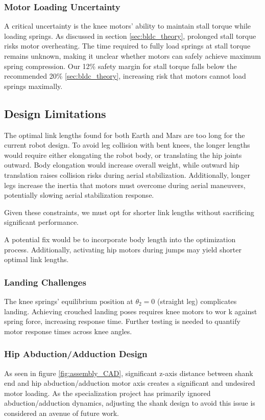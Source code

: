 \subsubsection{Motor Loading Uncertainty}
A critical uncertainty is the knee motors' ability to maintain stall torque while loading springs. As discussed in section \ref{sec:bldc_theory}, prolonged stall torque risks motor overheating. The time required to fully load springs at stall torque remains unknown, making it unclear whether motors can safely achieve maximum spring compression. Our 12\% safety margin for stall torque falls below the recommended 20\% \ref{sec:bldc_theory}, increasing risk that motors cannot load springs maximally.

\subsection{Design Limitations}

The optimal link lengths found for both Earth and Mars are too long for the current robot design. To avoid leg collision with bent knees, the longer lengths would require either elongating the robot body, or translating the hip joints outward. Body elongation would increase overall weight, while outward hip translation raises collision risks during aerial stabilization. Additionally, longer legs increase the inertia that motors must overcome during aerial maneuvers, potentially slowing aerial stabilization response.

Given these constraints, we must opt for shorter link lengths without sacrificing significant performance. 

A potential fix would be to incorporate body length into the optimization process. Additionally, activating hip motors during jumps may yield shorter optimal link lengths.

\subsubsection{Landing Challenges}
The knee springs' equilibrium position at $\theta_2=0$ (straight leg) complicates landing. Achieving crouched landing poses requires knee motors to wor k against spring force, increasing response time. Further testing is needed to quantify motor response times across knee angles.

\subsubsection{Hip Abduction/Adduction Design}
As seen in figure \ref{fig:assembly_CAD}, significant z-axis distance between shank end and hip abduction/adduction motor axis creates a significant and undesired motor loading. As the specialization project has primarily ignored abduction/adduction dynamics, 
adjusting the shank design to avoid this issue is considered an avenue of future work.

